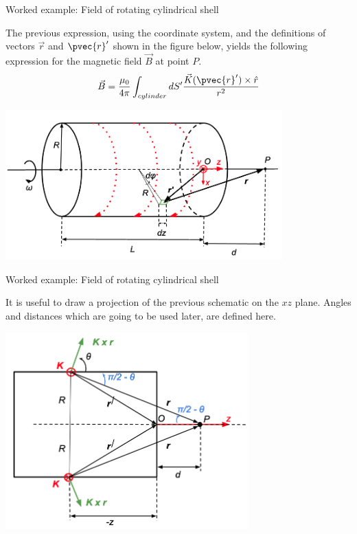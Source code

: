 {\begin{frame}{Worked example: Field of rotating cylindrical shell}

The previous expression, using the coordinate system, and the definitions
of vectors $\vec{r}$ and $\pvec{r}'$ shown in the figure below,
yields the following expression for the magnetic field $\vec{B}$ at point $P$.
\begin{equation*}
  \vec{B} = \frac{\mu_0}{4\pi}
    \int_{cylinder} dS^\prime
    \frac{\vec{K}(\pvec{r}') \times \hat{r}}{r^2}
\end{equation*}

\begin{center}
  \includegraphics[width=0.80\textwidth]{./images/problems/lect05_bfield_of_rotating_cylindrical_shell_a_1}\\
 \end{center}

\end{frame}

%
%
%

\begin{frame}{Worked example: Field of rotating cylindrical shell}

It is useful to draw a projection of the previous schematic on the $xz$ plane.
Angles and distances which are going to be used later, are defined here.
\begin{center}
  \includegraphics[width=0.70\textwidth]{./images/problems/lect05_bfield_of_rotating_cylindrical_shell_b_1}\\
\end{center}


\end{frame}}
